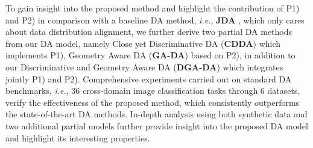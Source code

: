 \documentclass[journal,twocolumn]{IEEEtran}
\begin{document}
\begin{CJK*}{UTF8}{gkai}
    To gain insight into the proposed method and highlight the contribution of P1) and P2) in comparison with a baseline DA method, \textit{i.e.}, \textbf{JDA} \cite{long2013transfer},  which only cares about data distribution alignment, we further derive two partial DA methods from our DA model, namely Close yet Discriminative DA (\textbf{CDDA}) which implements P1), Geometry Aware DA (\textbf{GA-DA}) based on P2), in addition to our Discriminative and Geometry Aware DA (\textbf{DGA-DA}) which integrates jointly P1) and P2). 
    Comprehensive experiments carried out on standard DA benchmarks, \textit{i.e.},  36 cross-domain image classification tasks through 6 datasets, verify the effectiveness of the proposed method, which consistently outperforms the state-of-the-art DA methods. In-depth analysis using both synthetic data and two 	additional partial models further provide insight into the proposed DA model and highlight its interesting properties. 
    


\end{CJK*}
\end{document}
